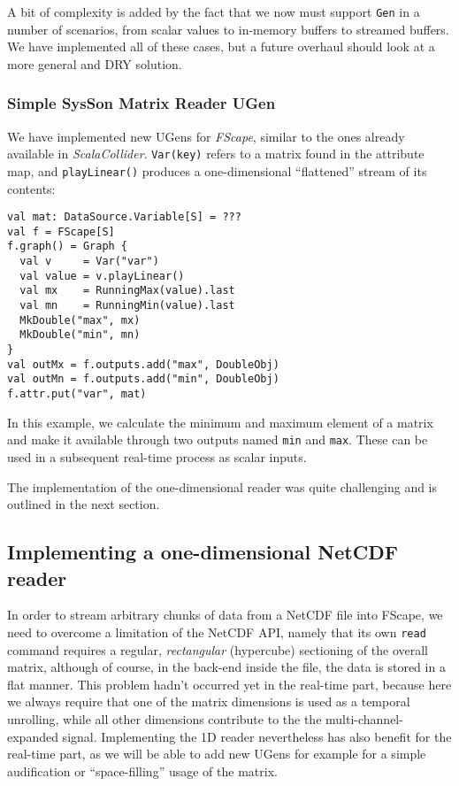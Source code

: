 \documentclass[11pt,a4paper]{article}
\newcommand{\software}[1]{\textit{#1}}
\begin{document}
A bit of complexity is added by the fact that we now must support \Verb!Gen! in a number of scenarios, from scalar values to in-memory buffers to streamed buffers. We have implemented all of these cases, but a future overhaul should look at a more general and DRY solution.

\subsubsection{Simple SysSon Matrix Reader UGen}

We have implemented new UGens for \software{FScape}, similar to the ones already available in 
\software{ScalaCollider}. \Verb!Var(key)! refers to a matrix found in the attribute map, and \Verb!playLinear()! produces a one-dimensional ``flattened'' stream of its contents:
%
\begin{lstlisting}[style=scala]
val mat: DataSource.Variable[S] = ???
val f = FScape[S]
f.graph() = Graph {
  val v     = Var("var")
  val value = v.playLinear()
  val mx    = RunningMax(value).last
  val mn    = RunningMin(value).last
  MkDouble("max", mx)
  MkDouble("min", mn)
}
val outMx = f.outputs.add("max", DoubleObj)
val outMn = f.outputs.add("min", DoubleObj)
f.attr.put("var", mat)
\end{lstlisting}
%
In this example, we calculate the minimum and maximum element of a matrix and make it available through two outputs named \Verb!min! and \Verb!max!. These can be used in a subsequent real-time process as scalar inputs.

The implementation of the one-dimensional reader was quite challenging and is outlined in the next section.

\subsection{Implementing a one-dimensional NetCDF reader}

In order to stream arbitrary chunks of data from a NetCDF file into FScape, we need to overcome a limitation of the NetCDF API, namely that its own \Verb!read! command requires a regular, \emph{rectangular} (hypercube) sectioning of the overall matrix, although of course, in the back-end inside the file, the data is stored in a flat manner. This problem hadn't occurred yet in the real-time part, because here we always require that one of the matrix dimensions is used as a temporal unrolling, while all other dimensions contribute to the the multi-channel-expanded signal. Implementing the 1D reader nevertheless has also benefit for the real-time part, as we will be able to add new UGens for example for a simple audification or ``space-filling'' usage of the matrix.
\end{document}
